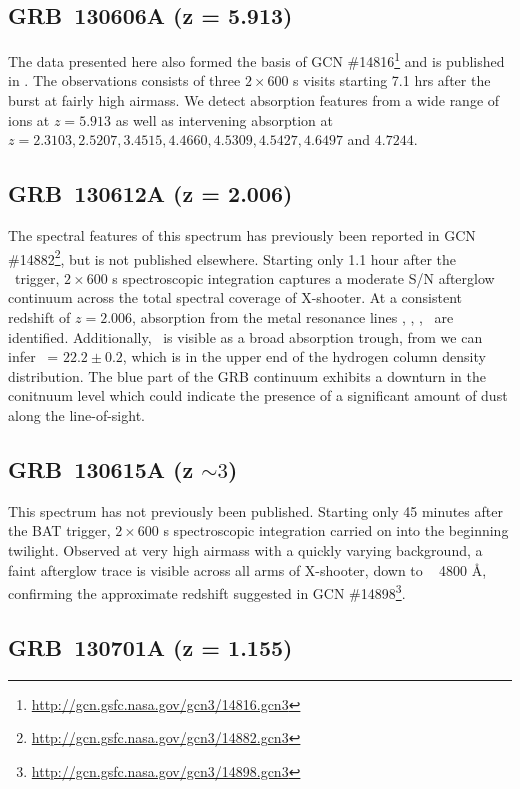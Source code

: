 \documentclass{aa}    %
\begin{document}
\subsection{GRB~130606A (z = 5.913)}

The data presented here also formed the basis of GCN
\#14816\footnote{\url{http://gcn.gsfc.nasa.gov/gcn3/14816.gcn3}} and is
published in \citet{Hartoog2015}. The observations consists of three
$2\times600$ s visits starting 7.1 hrs after the burst at fairly high airmass.
We detect absorption features from a wide range of ions at $z=5.913$ as well as
intervening absorption at $z=2.3103, 2.5207, 3.4515, 4.4660, 4.5309, 4.5427,
4.6497 $ and $ 4.7244$.


\subsection{GRB~130612A (z = 2.006)}

The spectral features of this spectrum has previously been reported in GCN
\#14882\footnote{\url{http://gcn.gsfc.nasa.gov/gcn3/14882.gcn3}}, but is not
published elsewhere. Starting only 1.1 hour after the \swift~trigger,
$2\times600$ s spectroscopic integration captures a moderate S/N afterglow
continuum across the total spectral coverage of X-shooter. At a consistent
redshift of $z = 2.006$, absorption from the metal resonance lines \feii, \mnii,
\mgii, \mgi~are identified. Additionally, \lya~is visible as a broad absorption
trough, from we can infer \nh~= $22.2 \pm 0.2$, which is in the upper end of the
hydrogen column density distribution. The blue part of the GRB continuum
exhibits a downturn in the conitnuum level which could indicate the presence of
a significant amount of dust along the line-of-sight.

\subsection{GRB~130615A (z $\sim 3$)}

This spectrum has not previously been published. Starting only 45 minutes after
the BAT trigger, $2\times600$ s spectroscopic integration carried on into the
beginning twilight. Observed at very high airmass with a quickly varying
background, a faint afterglow trace is visible across all arms of X-shooter,
down to ~ 4800 \AA, confirming the approximate redshift suggested in GCN
\#14898\footnote{\url{http://gcn.gsfc.nasa.gov/gcn3/14898.gcn3}}.


\subsection{GRB~130701A (z = 1.155)}	
\end{document}
